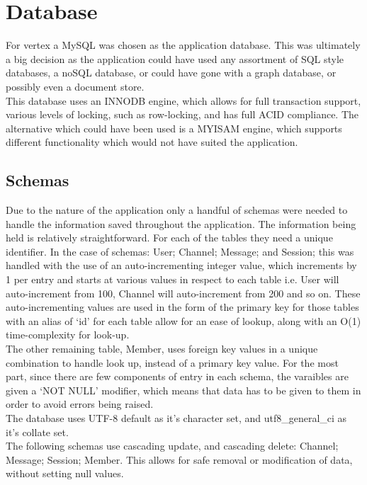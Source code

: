 \section{Database}
For vertex a MySQL was chosen as the application database. This was ultimately a big decision as the application could have used any assortment of SQL style databases, a noSQL database, or could have gone with a graph database, or possibly even a document store.
\\ This database uses an INNODB engine, which allows for full transaction support, various levels of locking, such as row-locking, and has full ACID compliance. The alternative which could have been used is a MYISAM engine, which supports different functionality which would not have suited the application.

\subsection{Schemas}
Due to the nature of the application only a handful of schemas were needed to handle the information saved throughout the application. The information being held is relatively straightforward. For each of the tables they need a unique identifier. In the case of schemas: User; Channel; Message; and Session; this was handled with the use of an auto-incrementing integer value, which increments by 1 per entry and starts at various values in respect to each table i.e. User will auto-increment from 100, Channel will auto-increment from 200 and so on. These auto-incrementing values are used in the form of the primary key for those tables with an alias of ‘id’ for each table allow for an ease of lookup, along with an O(1) time-complexity for look-up.
\\ The other remaining table, Member, uses foreign key values in a unique combination to handle look up, instead of a primary key value. For the most part, since there are few components of entry in each schema, the varaibles are given a ‘NOT NULL’ modifier, which means that data has to be given to them in order to avoid errors being raised.
\\ The database uses UTF-8 default as it’s character set, and utf8\_general\_ci as it’s collate set.
\\ The following schemas use cascading update, and cascading delete: Channel; Message; Session; Member. This allows for safe removal or modification of data, without setting null values.

